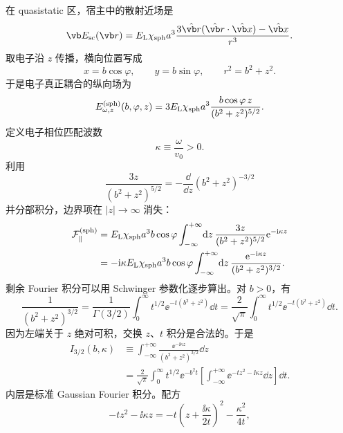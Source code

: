 在 quasistatic 区，宿主中的散射近场是
\begin{equation}
\vb E_{\rm sc}(\vb r)
=E_{\rm L}\chi_{\rm sph}a^3
\frac{3\hat{\vb r}(\hat{\vb r}\cdot\hat{\vb x})-\hat{\vb x}}{r^3}.
\label{eq:sphere-quasistatic-field}
\end{equation}
取电子沿 $z$ 传播，横向位置写成
\begin{equation}
x=b\cos\varphi,
\qquad
y=b\sin\varphi,
\qquad r^2=b^2+z^2.
\end{equation}
于是电子真正耦合的纵向场为
\begin{equation}
E_{\omega,z}^{(\rm sph)}(b,\varphi,z)
=3E_{\rm L}\chi_{\rm sph}a^3
\frac{b\cos\varphi\,z}{(b^2+z^2)^{5/2}}.
\label{eq:Ez-sphere-general}
\end{equation}
定义电子相位匹配波数
\begin{equation}
\kappa\equiv\frac{\omega}{v_0}>0.
\label{eq:kappa-electron}
\end{equation}
利用
\begin{equation}
\frac{3z}{(b^2+z^2)^{5/2}}
=-\frac{\dd}{\dd z}(b^2+z^2)^{-3/2}
\end{equation}
并分部积分，边界项在 $|z|\to\infty$ 消失：
\begin{align}
\mathcal F_{\parallel}^{(\rm sph)}
&=E_{\rm L}\chi_{\rm sph}a^3b\cos\varphi
\int_{-\infty}^{+\infty}\!\mathrm{d} z\,
\frac{3z}{(b^2+z^2)^{5/2}}\mathrm{e}^{-\mathrm{i}\kappa z}\\
&=-\mathrm{i}\kappa E_{\rm L}\chi_{\rm sph}a^3b\cos\varphi
\int_{-\infty}^{+\infty}\!\mathrm{d} z\,
\frac{\mathrm{e}^{-\mathrm{i}\kappa z}}{(b^2+z^2)^{3/2}}.
\end{align}
剩余 Fourier 积分可以用 Schwinger 参数化逐步算出。对 $b>0$，有
\begin{equation}
\frac{1}{(b^2+z^2)^{3/2}}
=\frac{1}{\Gamma(3/2)}
\int_0^{\infty} t^{1/2}\ee^{-t(b^2+z^2)}\dd t
=\frac{2}{\sqrt\pi}
\int_0^{\infty} t^{1/2}\ee^{-t(b^2+z^2)}\dd t.
\label{eq:schwinger-three-halves}
\end{equation}
因为左端关于 $z$ 绝对可积，交换 $z$、$t$ 积分是合法的。于是
\begin{align}
I_{3/2}(b,\kappa)
&\equiv
\int_{-\infty}^{+\infty}
\frac{\ee^{-\ii\kappa z}}{(b^2+z^2)^{3/2}}\dd z\\
&=\frac{2}{\sqrt\pi}
\int_0^{\infty}t^{1/2}\ee^{-b^2t}
\left[
\int_{-\infty}^{+\infty}
\ee^{-tz^2-\ii\kappa z}\dd z
\right]\dd t.
\end{align}
内层是标准 Gaussian Fourier 积分。配方
\begin{equation}
-tz^2-\ii\kappa z
=-t\left(z+\frac{\ii\kappa}{2t}\right)^2
-\frac{\kappa^2}{4t},
\end{equation}
